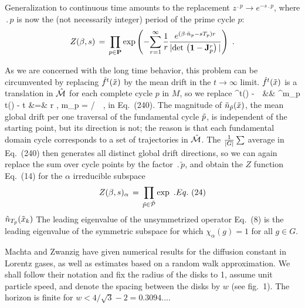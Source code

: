                                                             \toCB
Generalization to continuous time amounts to the replacement
$ z^{\period{p}} \rightarrow e^{-s \period{p}} $,
where $\period{p}$ is now the (not necessarily integer)
period of the prime cycle $p$:
$$
Z(\beta,s)\,=\,\prod_{p\in\PP} \exp \left( - {
 \sum_{r=1}^\infty {1 \over r}
 { e^{(\beta \cdot \hn_p- s \period{p}) r } %
 \over { | \det \left( {\bf 1}-{\bf J}_p^{r} \right) | } }
 } \right)
\,\, .
$$


 As we are concerned with the long time behavior,
 this problem can be circumvented
 by replacing $ \hat f^t(\tilde x{}) $ by the mean
 drift in the $t \rightarrow \infty$ limit.
 $ \hat f^t(\tilde x{}) $ is a translation in $\hat {{\cal M}}$ for each
 complete cycle $p$ in $M$, so we replace
 \bea
 \hf^t(\tx{\tpk}) - \tx{\tpk}
 \,\Longrightarrow \,
 &&
 { { \hf^{m_p t}(\tx{\tpk}) - \tx{\tpk} }
 }
 \continue
t &=& r , \quad m_p = / \quad \tx \in \tp \,\, ,
 \eea
 in Eq.~(240).
 The magnitude of ${\tilde n}_{{\tilde p}}(\tilde x{})$, the mean
 global drift per one traversal of the fundamental cycle ${\tilde p}$, is
 independent of the starting point, but its direction is not; the
 reason is that each fundamental domain cycle corresponds to a set of
 trajectories in $\hat {{\cal M}}$.
 The ${1 \over {|G|}} \sum$ average in
 Eq.~(240) then generates all distinct global drift
 directions, so we can again replace the
 sum over cycle points by the factor $\period{\tilde{p}}$, and obtain the
 $Z$ function Eq.~(14) for the $\alpha $ irreducible subspace
 $$
 Z(\beta,s)_\alpha\,=\,\prod_{{\tilde p} \in \tilde{\cal{P}} } \exp
 \,\, .
 Eq.~(24)
 $$
 $\hat n_{{T_{\tilde{p}}}}(\tilde x_k)$
 The leading eigenvalue of the
unsymmetrized
 operator Eq.~(8) is
 the leading eigenvalue of the symmetric subspace for which
 $\chi_\alpha(g)=1$ for all $g \in G$.




Machta and Zwanzig have given numerical results
for the diffusion constant in Lorentz gases,  as well as
estimates based on a random walk approximation. We shall follow
their notation and fix the radius of the disks to 1,
assume unit particle speed, and
denote the spacing between the disks by $w$ (see fig.~1).
The horizon is finite for $w < 4/\sqrt{3}-2 = 0.3094\dots$.
